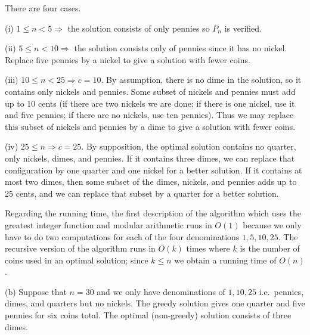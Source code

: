 \documentclass[10pt,reqno]{amsart}
\begin{document}
\begin{outline}[enumerate]
There are four cases.

(i) $1 \le n < 5 \Rightarrow$ the solution consists of only pennies so $P_n$ is
verified.

(ii) $5 \le n < 10 \Rightarrow$ the solution consists only of pennies since it
has no nickel. Replace five pennies by a nickel to give a solution with fewer
coins.

(iii) $10 \le n < 25 \Rightarrow c = 10.$ By assumption, there is no dime in
the solution, so it contains only nickels and pennies. Some subset of nickels
and pennies must add up to 10 cents (if there are two nickels we are done; if
there is one nickel, use it and five pennies; if there are no nickels, use ten
pennies). Thus we may replace this subset of nickels and pennies by a dime to
give a solution with fewer coins.

(iv) $25 \le n \Rightarrow c=25.$ By supposition, the optimal solution contains
no quarter, only nickels, dimes, and pennies. If it contains three dimes, we
can replace that configuration by one quarter and one nickel for a better
solution. If it contains at most two dimes, then some subset of the dimes,
nickels, and pennies adds up to 25 cents, and we can replace that subset by a
quarter for a better solution.

Regarding the running time, the first description of the algorithm which uses
the greatest integer function and modular arithmetic runs in $O(1)$ because we
only have to do two computations for each of the four denominations
$1,5,10,25$. The recursive version of the algorithm runs in $O(k)$ times where
$k$ is the number of coins used in an optimal solution; since $k \le n$ we
obtain a running time of $O(n)$.

(b) Suppose that $n=30$ and we only have denominations of $1,10,25$
i.e.~pennies, dimes, and quarters but no nickels. The greedy solution gives one
quarter and five pennies for six coins total. The optimal (non-greedy) solution
consists of three dimes.

\medskip


\end{outline}
\end{document}
